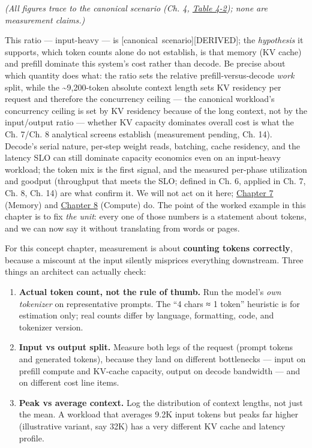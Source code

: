 \emph{(All figures trace to the canonical scenario (Ch. 4, \hyperref[tab:4.2]{Table 4-2});
none are measurement claims.)}

This ratio --- input-heavy --- is \mbox{{[}canonical scenario{]}}\hspace{0pt}\mbox{{[}DERIVED{]}};
the \emph{hypothesis} it supports, which token counts alone do not
establish, is that memory (KV cache) and prefill dominate this system's
cost rather than decode. Be precise about which quantity does what: the
ratio sets the relative prefill-versus-decode \emph{work} split, while
the \textasciitilde9,200-token absolute context length sets KV residency
per request and therefore the concurrency ceiling --- the canonical
workload's concurrency ceiling is set by KV residency because of the
long context, not by the input/output ratio --- whether KV capacity
dominates overall cost is what the Ch. 7/Ch. 8 analytical screens
establish (measurement pending, Ch. 14). Decode's serial nature,
per-step weight reads, batching, cache residency, and the latency SLO
can still dominate capacity economics even on an input-heavy workload;
the token mix is the first signal, and the measured per-phase
utilization and goodput (throughput that meets the SLO; defined in Ch.
6, applied in Ch. 7, Ch. 8, Ch. 14) are what confirm it. We will not act
on it here; \hyperref[chap:7]{Chapter 7} (Memory) and \hyperref[chap:8]{Chapter 8} (Compute) do. The point of
the worked example in this chapter is to fix \emph{the unit}: every one
of those numbers is a statement about tokens, and we can now say it
without translating from words or pages.

\label{measurement}


For this concept chapter, measurement is about \textbf{counting tokens
correctly}, because a miscount at the input silently misprices
everything downstream. Three things an architect can actually check:

\begin{enumerate}
\def\labelenumi{\arabic{enumi}.}
\tightlist
\item
  \textbf{Actual token count, not the rule of thumb.} Run the model's
  \emph{own tokenizer} on representative prompts. The ``4 chars ≈ 1
  token'' heuristic is for estimation only; real counts differ by
  language, formatting, code, and tokenizer version.
\item
  \textbf{Input vs output split.} Measure both legs of the request
  (prompt tokens and generated tokens), because they land on different
  bottlenecks --- input on prefill compute and KV-cache capacity, output
  on decode bandwidth --- and on different cost line items.
\item
  \textbf{Peak vs average context.} Log the distribution of context
  lengths, not just the mean. A workload that averages 9.2K input tokens
  but peaks far higher (illustrative variant, say 32K) has a very
  different KV cache and latency profile.
\end{enumerate}

